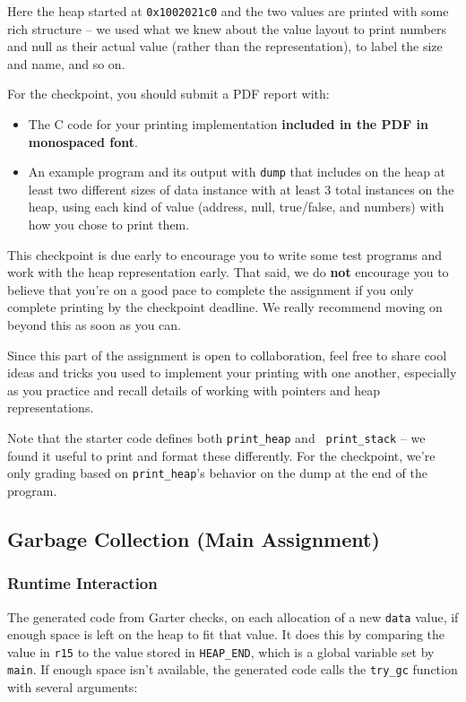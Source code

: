 \documentclass[10pt, oneside]{article}
\begin{document}
Here the heap started at {\tt 0x1002021c0} and the two values are printed
with some rich structure -- we used what we knew about the value layout to
print numbers and null as their actual value (rather than the
representation), to label the size and name, and so on.

For the checkpoint, you should submit a PDF report with:

\begin{itemize}
\item The C code for your printing implementation {\bf included in the PDF in
monospaced font}.
\item An example program and its output with {\tt dump} that includes on the
heap at least two different sizes of data instance with at least 3 total
instances on the heap, using each kind of value (address, null, true/false,
and numbers) with how you chose to print them.
\end{itemize}

This checkpoint is due early to encourage you to write some test programs and
work with the heap representation early. That said, we do {\bf not} encourage
you to believe that you're on a good pace to complete the assignment if you
only complete printing by the checkpoint deadline. We really recommend moving
on beyond this as soon as you can.

Since this part of the assignment is open to collaboration, feel free to
share cool ideas and tricks you used to implement your printing with one
another, especially as you practice and recall details of working with
pointers and heap representations.

Note that the starter code defines both {\tt print\_heap} and {\tt
print\_stack} -- we found it useful to print and format these differently.
For the checkpoint, we're only grading based on {\tt print\_heap}'s behavior
on the dump at the end of the program.

\subsection*{Garbage Collection (Main Assignment)}

\subsubsection*{Runtime Interaction}

The generated code from Garter checks, on each allocation of a new {\tt data}
value, if enough space is left on the heap to fit that value. It does this by
comparing the value in {\tt r15} to the value stored in {\tt HEAP\_END},
which is a global variable set by {\tt main}. If enough space isn't
available, the generated code calls the {\tt try\_gc} function with several arguments:
\end{document}
